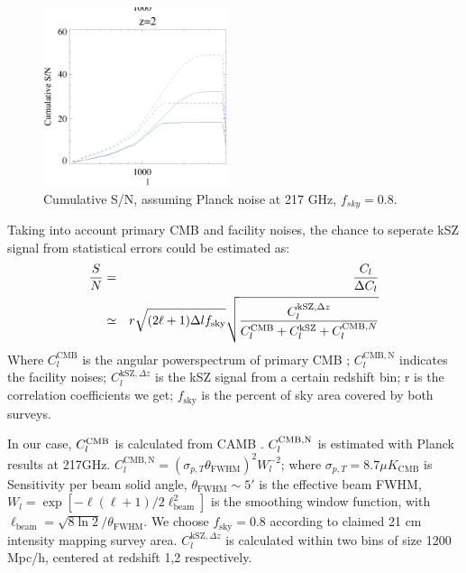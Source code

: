\begin{figure}[tbp]
\begin{center}
\includegraphics[width=0.48\textwidth]{figure/sn_z1_z2.eps}
\end{center}
\vspace{-0.7cm}
\caption{Cumulative S/N, assuming Planck noise at 217 GHz, $f_{sky}=0.8$. 
}
\label{fig:sn}
\end{figure}
Taking into account primary CMB and facility noises, 
the chance to seperate kSZ signal from statistical errors could be estimated 
as:
\begin{eqnarray}
    \frac{S}{N}&=&\frac{C_l}{\Delta C_l}\\\nonumber
               &\simeq&
    r\sqrt{(2\ell+1)\Delta l f_\mathrm{sky}}\sqrt{\frac{C_l^{\mathrm{kSZ},\Delta z}}{C_l^{\mathrm{CMB}}+C_l^\mathrm{kSZ}+C_l^{\mathrm{CMB},N}}}
\end{eqnarray}
Where $C_l^\mathrm{CMB}$ is the angular powerspectrum of primary CMB 
;
$C_l^\mathrm{CMB,N}$ indicates the facility noises; 
$C_l^{\mathrm{kSZ},\Delta z}$ is the kSZ signal from a certain redshift bin; 
r is the correlation coefficients we get; 
$f_\mathrm{sky}$ is the percent of sky area covered by both surveys.

In our case, $C_l^\mathrm{CMB}$ is calculated from CAMB \cite{CAMB}. 
$C_l^\mathrm{CMB,N}$ is estimated with Planck results \cite{Planck2015} at 217GHz.
$C_l^\mathrm{CMB,N}=(\sigma_{p,T}\theta_\mathrm{FWHM})^2W_l^{-2}$;  
where $\sigma_{p,T}=8.7\mu K_\mathrm{CMB}$ is Sensitivity per beam solid angle, 
$\theta_\mathrm{FWHM}\sim 5'$ is the effective beam FWHM, 
$W_l=\exp[-\ell(\ell+1)/2\ell^2_\mathrm{beam}]$ is the smoothing window function, 
with $\ell _\mathrm{beam}=\sqrt{8\ln2}/\theta_\mathrm{FWHM}$. 
We choose $f_\mathrm{sky}=0.8$ according to claimed 21 cm intensity mapping survey area. 
$C_l^{\mathrm{kSZ},\Delta z}$ is calculated within two bins of size 1200 Mpc/h, centered at redshift 1,2 respectively.

